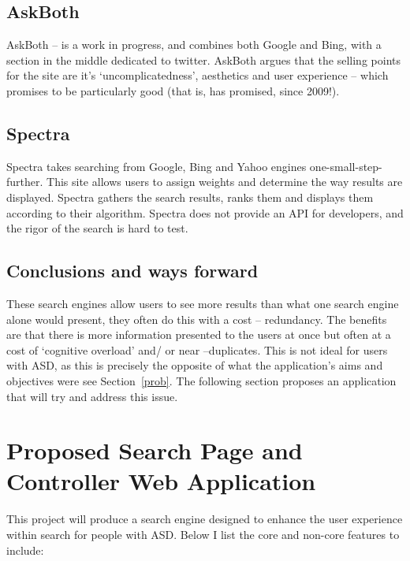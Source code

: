 \documentclass[10pt]{article}
\begin{document}
\subsection{AskBoth}
AskBoth – is a work in progress, and combines both Google and Bing, with a section in the middle dedicated to twitter. AskBoth argues that the selling points for the site are it’s ‘uncomplicatedness’, aesthetics and user experience – which promises to be particularly good (that is, has promised, since 2009!).

\subsection{Spectra}
Spectra takes searching from Google, Bing and Yahoo engines one-small-step-further. This site allows users to assign weights and determine the way results are displayed. Spectra gathers the search results, ranks them and displays them according to their algorithm. Spectra does not provide an API for developers, and the rigor of the search is hard to test.

\subsection{Conclusions and ways forward}
These search engines allow users to see more results than what one search engine alone would present, they often do this with a cost -- redundancy. The benefits are that there is more information presented to the users at once but often at a cost of ‘cognitive overload’ and/ or near –duplicates. This is not ideal for users with ASD, as this is precisely the opposite of what the application's aims and objectives were see Section~\ref{prob}.
The following section proposes an application that will try and address this issue.


\section{Proposed Search Page and Controller Web Application}\label{proposed}
This project will produce a search engine designed to enhance the user experience within search for people with ASD. Below I list the core and non-core features to include:
\end{document}
